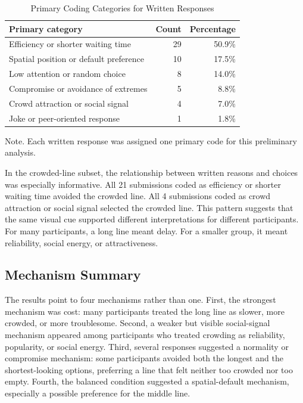 \documentclass[stu,12pt,floatsintext]{apa7}
\begin{document}
\begin{table}
\caption{Primary Coding Categories for Written Responses}
\centering
\begin{tabular}{lrr}
\hline
Primary category & Count & Percentage \\
\hline
Efficiency or shorter waiting time & 29 & 50.9\% \\
Spatial position or default preference & 10 & 17.5\% \\
Low attention or random choice & 8 & 14.0\% \\
Compromise or avoidance of extremes & 5 & 8.8\% \\
Crowd attraction or social signal & 4 & 7.0\% \\
Joke or peer-oriented response & 1 & 1.8\% \\
\hline
\end{tabular}
\smallskip
\noindent Note. Each written response was assigned one primary code for this preliminary analysis.
\label{tab:coding}
\end{table}

In the crowded-line subset, the relationship between written reasons and choices was especially informative. All 21 submissions coded as efficiency or shorter waiting time avoided the crowded line. All 4 submissions coded as crowd attraction or social signal selected the crowded line. This pattern suggests that the same visual cue supported different interpretations for different participants. For many participants, a long line meant delay. For a smaller group, it meant reliability, social energy, or attractiveness.

\subsection{Mechanism Summary}

The results point to four mechanisms rather than one. First, the strongest mechanism was cost: many participants treated the long line as slower, more crowded, or more troublesome. Second, a weaker but visible social-signal mechanism appeared among participants who treated crowding as reliability, popularity, or social energy. Third, several responses suggested a normality or compromise mechanism: some participants avoided both the longest and the shortest-looking options, preferring a line that felt neither too crowded nor too empty. Fourth, the balanced condition suggested a spatial-default mechanism, especially a possible preference for the middle line.
\end{document}
